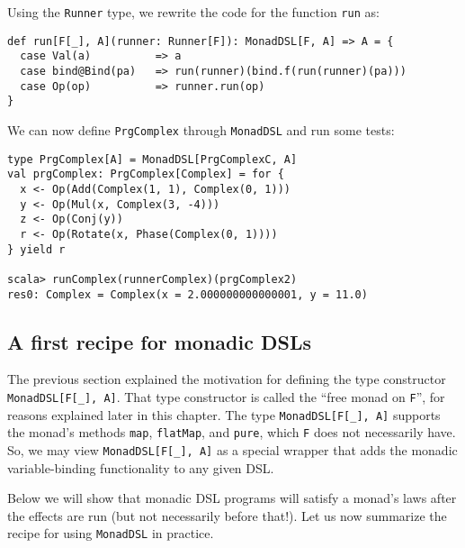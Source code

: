 Using the \lstinline!Runner!
type, we rewrite the code for the function \lstinline!run!
as:
\begin{lstlisting}
def run[F[_], A](runner: Runner[F]): MonadDSL[F, A] => A = {
  case Val(a)          => a
  case bind@Bind(pa)   => run(runner)(bind.f(run(runner)(pa)))
  case Op(op)          => runner.run(op)
}
\end{lstlisting}
We can now define \lstinline!PrgComplex!
through \lstinline!MonadDSL!
and run some tests:
\begin{lstlisting}
type PrgComplex[A] = MonadDSL[PrgComplexC, A]
val prgComplex: PrgComplex[Complex] = for {
  x <- Op(Add(Complex(1, 1), Complex(0, 1)))
  y <- Op(Mul(x, Complex(3, -4)))
  z <- Op(Conj(y))
  r <- Op(Rotate(x, Phase(Complex(0, 1))))
} yield r

scala> runComplex(runnerComplex)(prgComplex2)
res0: Complex = Complex(x = 2.000000000000001, y = 11.0)
\end{lstlisting}

\subsection{A first recipe for monadic DSLs}

The previous section explained the motivation for defining the type
constructor \lstinline!MonadDSL[F[_], A]!.
That type constructor is called the \textsf{``}free monad on \lstinline!F!\textsf{''},
for reasons explained later in this chapter. The type \lstinline!MonadDSL[F[_], A]!
supports the monad\textsf{'}s methods \lstinline!map!,
\lstinline!flatMap!, and
\lstinline!pure!, which
\lstinline!F! does not
necessarily have. So, we may view \lstinline!MonadDSL[F[_], A]!
as a special wrapper that adds the monadic variable-binding functionality
to any given DSL.

Below we will show that monadic DSL programs will satisfy a monad\textsf{'}s
laws after the effects are run (but not necessarily before that!).
Let us now summarize the recipe for using \lstinline!MonadDSL!
in practice.


